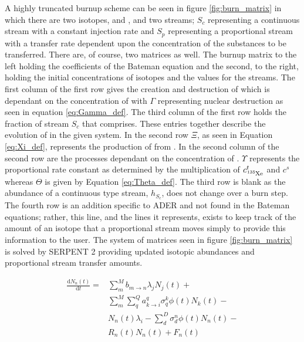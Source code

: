 A highly truncated burnup scheme can be
seen in figure \ref{fig:burn_matrix} in which there are two isotopes,
 and , and two streams; $S_{c}$ representing a
continuous stream with a constant injection rate and $S_{p}$ representing a
proportional stream with a transfer rate dependent upon the concentration
of the substances to be transferred. There are, of course, two matrices as well.
The burnup matrix to the left holding the coefficients of the Bateman equation
and the second, to the right, holding the initial concentrations of isotopes
and the values for the streams. The first column of the first row gives
the creation and destruction of  which is dependant on the
concentration of  with $\Gamma$ representing nuclear destruction as
seen in equation \ref{eq:Gamma_def}. The third column of the first row holds
the fraction of stream $S_{c}$ that  comprises. These entries
together describe the evolution of  in the given system. In the
second row $\Xi$, as seen in Equation \ref{eq:Xi_def}, represents the production
of  from . In the second column of the second row are
the processes dependant on the concentration of . $\Upsilon$
represents the proportional rate constant as determined by the multiplication
of $c_{\ce{^{135}Xe}}^{t}$ and $c^{s}$ whereas $\Theta$ is given by Equation \ref{eq:Theta_def}. The third row is blank as the abundance of a continuous type
stream, $h_{S_{c}}$, does not change over a burn step. The fourth row is an
addition specific to ADER and not found in the Bateman equations; rather, this
line, and the lines it represents, exists to keep track of the amount of an
isotope that a proportional stream moves simply to provide this information
to the user. The system of matrices seen in figure \ref{fig:burn_matrix} is
solved by SERPENT 2 providing updated isotopic abundances and proportional 
stream transfer amounts.

    \begin{equation}
    \label{eq:Bateman}
    \begin{split}
        \frac{\mathrm{d}N_{n}(t)}{\mathrm{d}t} = & \sum \limits_{m}^{M} 
        b_{m \rightarrow n} \lambda_{j} N_{j}(t) + \\
        & \sum \limits_{m}^{M}
        \sum \limits_{q}^{Q} a_{k \rightarrow i}^{q}
        \sigma_{q}^{k} \phi(t) N_{k}(t) - \\
        & N_{n}(t) \lambda_{i} - \sum \limits_{d}^{D}
        \sigma_{d}^{n} \phi(t) N_{n}(t) - \\
        & R_{n}(t) N_{n}(t) + F_{n}(t)
    \end{split}
    \end{equation}

